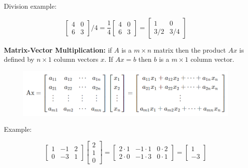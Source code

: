 \documentclass{article}
\begin{document}
        \noindent Division example:

        \begin{equation*}
            \begin{bmatrix}
                4 & 0 \\
                6 & 3
            \end{bmatrix}
            /4
            =
            \frac{1}{4}
            \begin{bmatrix}
                4 & 0 \\
                6 & 3
            \end{bmatrix}
            =
            \begin{bmatrix}
                1   & 0 \\
                3/2 & 3/4
            \end{bmatrix}
        \end{equation*}

        \noindent \textbf{Matrix-Vector Multiplication:} if $A$ is a $m\times n$ matrix then the product $Ax$
        is defined by $n\times 1$ column vectors $x$. If $Ax=b$ then $b$ is a $m\times 1$ column vector.

        \begin{figure}[hbt!]
            \centering
            \includegraphics[scale=0.75]{Resources/Matrix_Vector_Mult}
        \end{figure}

        \noindent Example:

        \begin{equation*}
            \begin{bmatrix}
                1 & -1 & 2 \\
                0 & -3 & 1
            \end{bmatrix}
            \begin{bmatrix}
                2 \\
                1 \\
                0
            \end{bmatrix}
            =
            \begin{bmatrix}
                2\cdot 1    & -1\cdot 1 & 0\cdot 2 \\
                2\cdot 0    & -1\cdot 3 & 0\cdot 1
            \end{bmatrix}
            =
            \begin{bmatrix}
                1 \\
                -3
            \end{bmatrix}
        \end{equation*}
\end{document}
